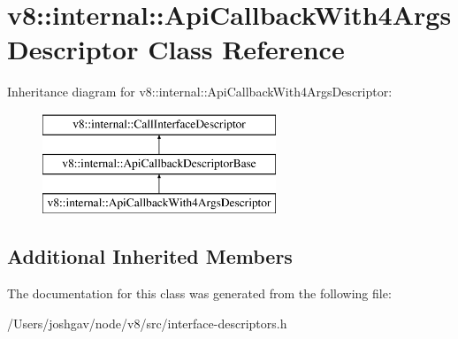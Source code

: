 \hypertarget{classv8_1_1internal_1_1_api_callback_with4_args_descriptor}{}\section{v8\+:\+:internal\+:\+:Api\+Callback\+With4\+Args\+Descriptor Class Reference}
\label{classv8_1_1internal_1_1_api_callback_with4_args_descriptor}
Inheritance diagram for v8\+:\+:internal\+:\+:Api\+Callback\+With4\+Args\+Descriptor\+:\begin{figure}[H]
\begin{center}
\leavevmode
\includegraphics[height=3.000000cm]{classv8_1_1internal_1_1_api_callback_with4_args_descriptor}
\end{center}
\end{figure}
\subsection*{Additional Inherited Members}


The documentation for this class was generated from the following file\+:\begin{DoxyCompactItemize}
\item 
/\+Users/joshgav/node/v8/src/interface-\/descriptors.\+h\end{DoxyCompactItemize}
